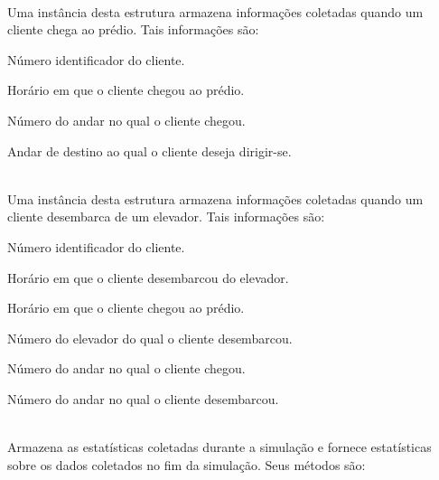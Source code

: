 \begin{description}\setlength\itemsep{0mm}
  \item[Arrival] \hfill \\
    Uma instância desta estrutura armazena informações coletadas quando um
    cliente chega ao prédio. Tais informações são:

    \begin{description}[leftmargin=!,labelwidth=\widthof{\bfseries destinationFloor}]\setlength\itemsep{0mm}
      \item[\texttt{clientId}] Número identificador do cliente.
      \item[\texttt{arrivalTime}] Horário em que o cliente chegou ao prédio.
      \item[\texttt{arrivalFloor}] Número do andar no qual o cliente chegou.
      \item[\texttt{destinationFloor}] Andar de destino ao qual o cliente deseja dirigir-se.
    \end{description}

  \item[Trip] \hfill \\
    Uma instância desta estrutura armazena informações coletadas quando um
    cliente desembarca de um elevador. Tais informações são:

    \begin{description}[leftmargin=!,labelwidth=\widthof{\bfseries destinationFloor}]\setlength\itemsep{0mm}
      \item[\texttt{clientId}] Número identificador do cliente.
      \item[\texttt{dropoffTime}] Horário em que o cliente desembarcou do elevador.
      \item[\texttt{createTime}] Horário em que o cliente chegou ao prédio.
      \item[\texttt{elevatorId}] Número do elevador do qual o cliente desembarcou.
      \item[\texttt{arrivalFloor}] Número do andar no qual o cliente chegou.
      \item[\texttt{dropoffFloor}] Número do andar no qual o cliente desembarcou.
    \end{description}

  \item[Statistics] \hfill \\
    Armazena as estatísticas coletadas durante a simulação e fornece
    estatísticas sobre os dados coletados no fim da simulação. Seus
    métodos são:


\end{description}
